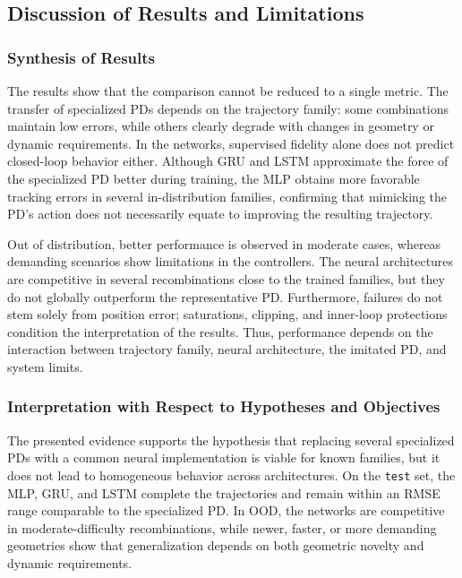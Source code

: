 \subsection{Discussion of Results and Limitations}
\label{subsec:discusion-resultados}

\subsubsection*{Synthesis of Results}

The results show that the comparison cannot be reduced to a single metric. The transfer of specialized PDs depends on the trajectory family: some combinations maintain low errors, while others clearly degrade with changes in geometry or dynamic requirements. In the networks, supervised fidelity alone does not predict closed-loop behavior either. Although GRU and LSTM approximate the force of the specialized PD better during training, the MLP obtains more favorable tracking errors in several in-distribution families, confirming that mimicking the PD's action does not necessarily equate to improving the resulting trajectory.

Out of distribution, better performance is observed in moderate cases, whereas demanding scenarios show limitations in the controllers. The neural architectures are competitive in several recombinations close to the trained families, but they do not globally outperform the representative PD. Furthermore, failures do not stem solely from position error; saturations, clipping, and inner-loop protections condition the interpretation of the results. Thus, performance depends on the interaction between trajectory family, neural architecture, the imitated PD, and system limits.

\subsubsection*{Interpretation with Respect to Hypotheses and Objectives}

The presented evidence supports the hypothesis that replacing several specialized PDs with a common neural implementation is viable for known families, but it does not lead to homogeneous behavior across architectures. On the \texttt{test} set, the MLP, GRU, and LSTM complete the trajectories and remain within an RMSE range comparable to the specialized PD. In OOD, the networks are competitive in moderate-difficulty recombinations, while newer, faster, or more demanding geometries show that generalization depends on both geometric novelty and dynamic requirements.

